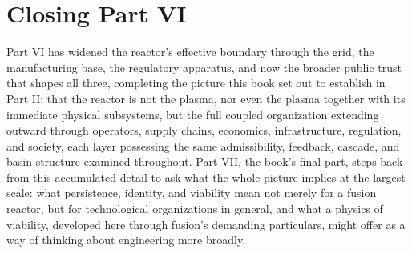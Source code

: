 \section{Closing Part VI}

Part VI has widened the reactor's effective boundary through the grid, the manufacturing base, the regulatory apparatus, and now the broader public trust that shapes all three, completing the picture this book set out to establish in Part II: that the reactor is not the plasma, nor even the plasma together with its immediate physical subsystems, but the full coupled organization extending outward through operators, supply chains, economics, infrastructure, regulation, and society, each layer possessing the same admissibility, feedback, cascade, and basin structure examined throughout. Part VII, the book's final part, steps back from this accumulated detail to ask what the whole picture implies at the largest scale: what persistence, identity, and viability mean not merely for a fusion reactor, but for technological organizations in general, and what a physics of viability, developed here through fusion's demanding particulars, might offer as a way of thinking about engineering more broadly.
